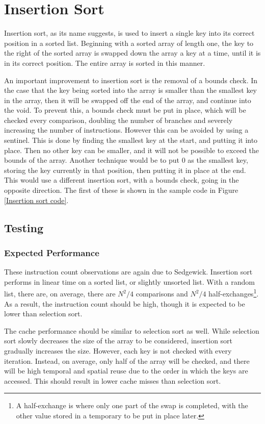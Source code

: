 \section{Insertion Sort}

Insertion sort, as its name suggests, is used to insert a single key into its
correct position in a sorted list. Beginning with a sorted array of length one,
the key to the right of the sorted array is swapped down the array a key at a
time, until it is in its correct position. The entire array is sorted in this
manner.

An important improvement to insertion sort is the removal of a bounds check. In
the case that the key being sorted into the array is smaller than the smallest
key in the array, then it will be swapped off the end of the array, and continue
into the void. To prevent this, a bounds check must be put in place, which will
be checked every comparison, doubling the number of branches and severely
increasing the number of instructions. However this can be avoided by using a
sentinel. This is done by finding the smallest key at the start, and putting it
into place. Then no other key can be smaller, and it will not be possible to
exceed the bounds of the array. Another technique would be to put $0$ as the
smallest key, storing the key currently in that position, then putting it in
place at the end. This would use a different insertion sort, with a bounds
check, going in the opposite direction. The first of these is shown in the
sample code in Figure \vref{Insertion sort code}.

\subsection{Testing}
\subsubsection{Expected Performance}
These instruction count observations are again due to Sedgewick. Insertion sort
performs in linear time on a sorted list, or slightly unsorted list. With a
random list, there are, on average, there are $N^2/4$ comparisons and $N^2/4$
half-exchanges\footnote{A half-exchange is where only one part of the swap is
completed, with the other value stored in a temporary to be put in place
later.}. As a result, the instruction count should be high, though it is
expected to be lower than selection sort.

The cache performance should be similar to selection sort as well. While
selection sort slowly decreases the size of the array to be considered,
insertion sort gradually increases the size. However, each key is not checked
with every iteration. Instead, on average, only half of the array will be
checked, and there will be high temporal and spatial reuse due to the order in
which the keys are accessed. This should result in lower cache misses than
selection sort.


